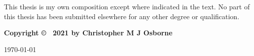 
\thispagestyle{empty}

\newpage\markboth{}{}

\vspace*{4cm}
\begin{flushright}
\parbox{130mm}{
\hrulefill

This thesis is my own composition except where indicated in
the text. No part of this thesis has been submitted elsewhere for any other degree
or qualification.
\vspace*{1cm}

\textbf{Copyright © ~2021 by Christopher M J Osborne}
\vspace*{0.4cm}

\today

\hrulefill{}}
\end{flushright}
